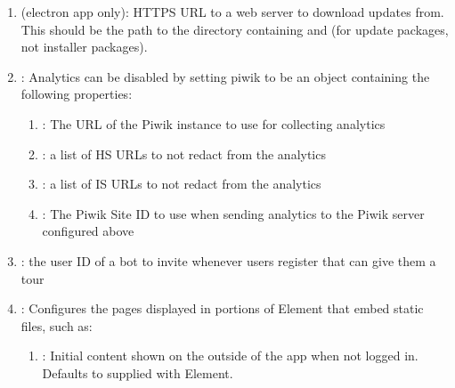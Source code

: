 \documentclass[letterpaper,10pt,openany,oneside,english]{sphinxmanual}
\begin{document}
\begin{enumerate}
\item {} 
\sphinxAtStartPar
{} (electron app only): HTTPS URL to a web server to download
updates from. This should be the path to the directory containing 
and  (for update packages, not installer packages).

\item {} 
\sphinxAtStartPar
{}: Analytics can be disabled by setting piwik\textasciigrave{} to be an object
containing the following properties:
\begin{enumerate}
%
\item {} 
\sphinxAtStartPar
{}: The URL of the Piwik instance to use for collecting analytics

\item {} 
\sphinxAtStartPar
{}: a list of HS URLs to not redact from the analytics

\item {} 
\sphinxAtStartPar
{}: a list of IS URLs to not redact from the analytics

\item {} 
\sphinxAtStartPar
{}: The Piwik Site ID to use when sending analytics to the Piwik server configured above

\end{enumerate}

\item {} 
\sphinxAtStartPar
{}: the user ID of a bot to invite whenever users register that can give them a tour

\item {} 
\sphinxAtStartPar
{}: Configures the pages displayed in portions of Element that
embed static files, such as:
\begin{enumerate}
%
\item {} 
\sphinxAtStartPar
{}: Initial content shown on the outside of the app when not
logged in. Defaults to  supplied with Element.


\end{enumerate}
\end{enumerate}
\end{document}
